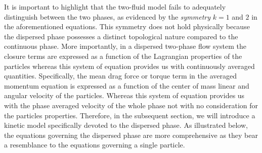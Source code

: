 It is important to highlight that the two-fluid model fails to adequately distinguish between the two phases, as evidenced by the \textit{symmetry} $k = 1$ and $2$ in the aforementioned equations. This symmetry does not hold physically because the dispersed phase possesses a distinct topological nature compared to the continuous phase. 
More importantly, in a dispersed two-phase flow system the closure terms are expressed as a function of the Lagrangian properties of the particles whereas this system of equation provides us with continuously averaged quantities. 
Specifically, the mean drag force or torque term in the averaged momentum equation is expressed as a function of the center of mass linear and angular velocity  of the particles. 
Whereas this system of equation provides us with the phase averaged velocity of the whole phase not with no consideration for the particles properties.  
Therefore, in the subsequent section, we will introduce a kinetic model specifically devoted to the dispersed phase. 
As illustrated below, the equations governing the dispersed phase are more comprehensive as they bear a resemblance to the equations governing a single particle.

